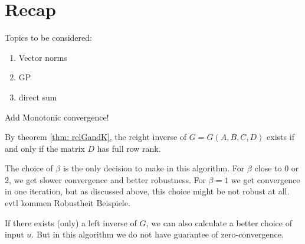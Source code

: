 \chapter{Recap} 
Topics to be considered: 
\begin{enumerate}
	\item Vector norms 
	\item GP 
	\item direct sum 
\end{enumerate}
Add Monotonic convergence! 



By theorem \ref{thm: relGandK}, the reight inverse of $G = G(A,B,C,D)$ exists if and only if the matrix $D$ has full row rank. 

The choice of $\beta$ is the only decision to make in this algorithm. For $\beta$ close to 0 or 2, we get slower convergence and better robustness. For $\beta = 1$ we get convergence in one iteration, but as discussed above, this choice might be not robust at all. {\color{red} evtl kommen Robustheit Beispiele}. 

If there exists (only) a left inverse of $G$, we can also calculate a better choice of input $u$. But in this algorithm we do not have guarantee of zero-convergence. 



